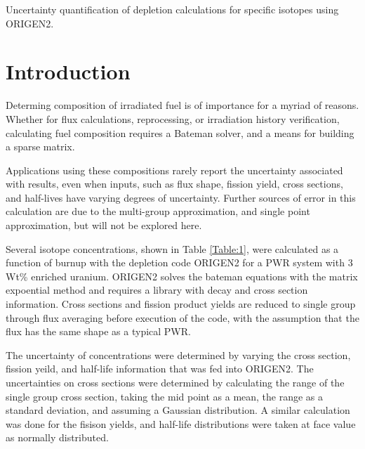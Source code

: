 \documentclass[11pt,notitlepage]{article}
\newcommand\tab[1][0.6cm]{\hspace*{#1}}
\begin{document}
\vspace*{0.5cm}


\vspace{1cm}
Uncertainty quantification of depletion calculations
for specific isotopes using ORIGEN2.

 
\section{Introduction}

\tab
Determing composition of irradiated fuel is of importance
for a myriad of reasons. Whether for flux calculations,
reprocessing, or irradiation history verification,
calculating fuel composition requires a Bateman solver,
and a means for building a sparse matrix.

Applications using these compositions rarely report the
uncertainty associated with results, even when inputs,
such as flux shape, fission yield, cross sections,
and half-lives have varying degrees of uncertainty. Further
sources of error in this calculation are due to the multi-group
approximation, and single point approximation,
but will not be explored here.

Several isotope concentrations, shown in Table \ref{Table:1},
were calculated as a function of burnup
with the depletion code ORIGEN2 for a PWR system with 3 Wt\%
enriched uranium. ORIGEN2 solves the bateman equations with
the matrix expoential method and requires a library
with decay and cross section information. Cross sections and
fission product yields are reduced to single group through flux
averaging before execution of the code,
with the assumption that the flux has the same shape as a typical PWR.

The uncertainty of concentrations were determined by varying the
cross section, fission yeild, and half-life information
that was fed into ORIGEN2. The uncertainties on cross sections
were determined by calculating the range of the single group
cross section, taking the mid point as a mean, the range as
a standard deviation, and assuming a Gaussian distribution.
A similar calculation was done for the fisison yields, and
half-life distributions were taken at face value as normally
distributed. 
\end{document}
